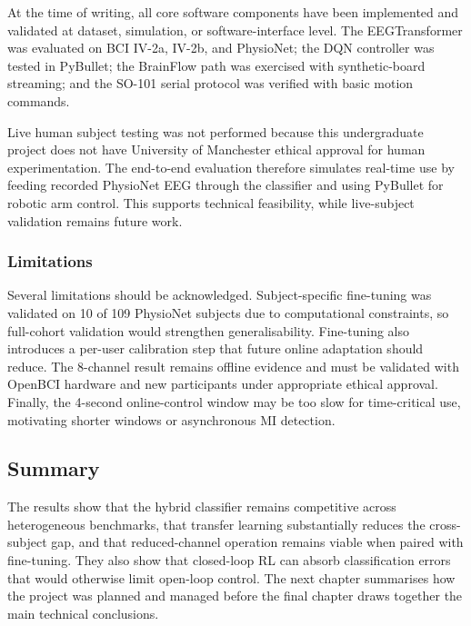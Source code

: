 \documentclass[12pt, a4paper]{article}
\begin{document}
At the time of writing, all core software components have been implemented and validated at dataset, simulation, or software-interface level. The EEGTransformer was evaluated on BCI IV-2a, IV-2b, and PhysioNet; the DQN controller was tested in PyBullet; the BrainFlow path was exercised with synthetic-board streaming; and the SO-101 serial protocol was verified with basic motion commands.

Live human subject testing was not performed because this undergraduate project does not have University of Manchester ethical approval for human experimentation. The end-to-end evaluation therefore simulates real-time use by feeding recorded PhysioNet EEG through the classifier and using PyBullet for robotic arm control. This supports technical feasibility, while live-subject validation remains future work.

\subsubsection{Limitations}
\label{sec:disc_limitations}

Several limitations should be acknowledged. Subject-specific fine-tuning was validated on 10 of 109 PhysioNet subjects due to computational constraints, so full-cohort validation would strengthen generalisability. Fine-tuning also introduces a per-user calibration step that future online adaptation should reduce. The 8-channel result remains offline evidence and must be validated with OpenBCI hardware and new participants under appropriate ethical approval. Finally, the 4-second online-control window may be too slow for time-critical use, motivating shorter windows or asynchronous MI detection.

\subsection{Summary}

The results show that the hybrid classifier remains competitive across heterogeneous benchmarks, that transfer learning substantially reduces the cross-subject gap, and that reduced-channel operation remains viable when paired with fine-tuning. They also show that closed-loop RL can absorb classification errors that would otherwise limit open-loop control. The next chapter summarises how the project was planned and managed before the final chapter draws together the main technical conclusions.
\end{document}
